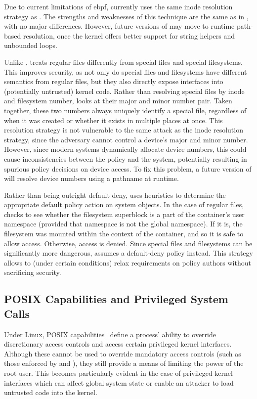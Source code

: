 Due to current limitations of \gls{ebpf}, \bpfcontain{} currently uses the same inode
resolution strategy as \bpfbox{}. The strengths and weaknesses of this technique are the
same as in \bpfbox{}, with no major differences. However, future versions of \bpfcontain{}
may move to runtime path-based resolution, once the kernel offers better support for
string helpers and unbounded loops.

Unlike \bpfbox{}, \bpfcontain{} treats regular files differently from special files and
special filesystems. This improves security, as not only do special files and filesystems
have different semantics from regular files, but they also directly expose interfaces into
(potentially untrusted) kernel code. Rather than resolving special files by inode and
filesystem number, \bpfcontain{} looks at their major and minor number pair. Taken
together, these two numbers always uniquely identify a special file, regardless of when it
was created or whether it exists in multiple places at once. This resolution strategy is
not vulnerable to the same attack as the inode resolution strategy, since the adversary
cannot control a device's major and minor number. However, since modern systems
dynamically allocate device numbers, this could cause inconsistencies between the policy
and the system, potentially resulting in spurious policy decisions on device access. To
fix this problem, a future version of \bpfcontain{} will resolve device numbers using
a pathname at runtime.

Rather than being outright default deny, \bpfcontain{} uses heuristics to determine the
appropriate default policy action on system objects. In the case of regular files,
\bpfcontain{} checks to see whether the filesystem superblock is a part of the container's
user namespace (provided that namespace is not the global namespace). If it is, the
filesystem was mounted within the context of the container, and so it is safe to allow
access. Otherwise, access is denied. Since special files and filesystems can be
significantly more dangerous, \bpfcontain{} assumes a default-deny policy instead. This
strategy allows \bpfcontain{} to (under certain conditions) relax requirements on policy
authors without sacrificing security.

\subsection{POSIX Capabilities and Privileged System Calls}

Under Linux, POSIX capabilities~\cite{posix_capabilities} define a process' ability to
override discretionary access controls and access certain privileged kernel interfaces.
Although these cannot be used to override mandatory access controls (such as those
enforced by \bpfbox{} and \bpfcontain{}), they still provide a means of limiting the power
of the root user. This becomes particularly evident in the case of privileged kernel
interfaces which can affect global system state or enable an attacker to load untrusted
code into the kernel.

